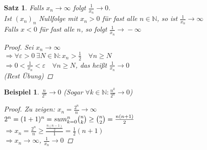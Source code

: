 \documentclass[11pt, twoside, a4paper]{article}
\theoremstyle{plain}
\newtheorem{satz}[blockelement]{Satz}
\newtheorem{beispiel}[blockelement]{Beispiel}
\newcommand{\impl}[0]{\Rightarrow{}}
\newcommand{\fromto}{\rightarrow{}}
\newcommand{\naturalnumbers}{\mathbb{N}}
\begin{document}
    \begin{satz}
        Falls $x_n\fromto \infty$ folgt $\frac{1}{x_n}\fromto 0$.\\
        Ist $(x_n)_n$ Nullfolge mit $x_n > 0$ für fast alle $n\in\naturalnumbers$, so ist $\frac{1}{x_n}\fromto \infty$\\
        Falls $x < 0$ für fast alle $n$, so folgt $\frac{1}{x_n} \fromto -\infty$
        \begin{proof}
            Sei $x_n\fromto \infty$\\
            $\impl \forall \varepsilon > 0~\exists N\in\naturalnumbers\colon x_n > \frac{1}{2}\quad\forall n \geq N$\\
            $\impl 0 < \frac{1}{x_n} < \varepsilon\quad \forall n \geq N$, das heißt $\frac{1}{x_n}\fromto 0$\\
            (Rest Übung)
        \end{proof}
    \end{satz}

    \begin{beispiel}
        $\frac{n}{2^n}\fromto 0$ (Sogar $\forall k\in\naturalnumbers\colon \frac{n^k}{2^n} \fromto 0$)

        \begin{proof}
            Zu zeigen: $x_n = \frac{2^n}{n}\fromto \infty$\\
            $2^n = (1+1)^n = \\sum_{k=0}^{n} \binom{n}{k}\geq \binom{n}{2} = \frac{n(n+1)}{2}$\\
            $\impl x_n = \frac{2^n}{n}\geq \frac{\frac{n(n-1)}{2}}{1} = \frac{1}{2}(n+1)$\\
            $\impl x_n \fromto \infty$, $\frac{1}{x_n}\fromto 0$
        \end{proof}
    \end{beispiel}
\end{document}
